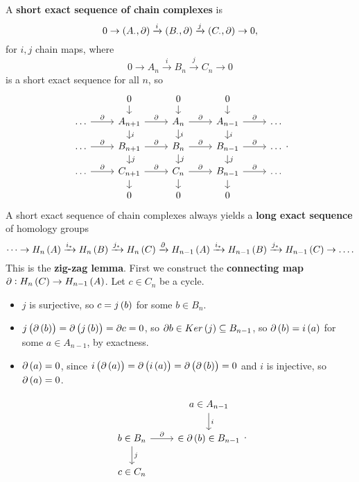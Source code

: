 A \textbf{short exact sequence of chain complexes} is
$$ 0 \to \br{A_\cdot, \partial} \xrightarrow{i} \br{B_\cdot, \partial} \xrightarrow{j} \br{C_\cdot, \partial} \to 0, $$
for $ i, j $ chain maps, where
$$ 0 \to A_n \xrightarrow{i} B_n \xrightarrow{j} C_n \to 0 $$
is a short exact sequence for all $ n $, so
$$
\begin{tikzcd}[row sep=small]
& 0 \arrow{d} & 0 \arrow{d} & 0 \arrow{d} & \\
\dots \arrow{r}{\partial} & A_{n + 1} \arrow{r}{\partial} \arrow{d}{i} & A_n \arrow{r}{\partial} \arrow{d}{i} & A_{n - 1} \arrow{r}{\partial} \arrow{d}{i} & \dots \\
\dots \arrow{r}{\partial} & B_{n + 1} \arrow{r}{\partial} \arrow{d}{j} & B_n \arrow{r}{\partial} \arrow{d}{j} & B_{n - 1} \arrow{r}{\partial} \arrow{d}{j} & \dots \\
\dots \arrow{r}{\partial} & C_{n + 1} \arrow{r}{\partial} \arrow{d} & C_n \arrow{r}{\partial} \arrow{d} & B_{n - 1} \arrow{r}{\partial} \arrow{d} & \dots \\
& 0 & 0 & 0 &
\end{tikzcd}.
$$
A short exact sequence of chain complexes always yields a \textbf{long exact sequence} of homology groups
$$ \dots \to H_n\br{A} \xrightarrow{i_*} H_n\br{B} \xrightarrow{j_*} H_n\br{C} \xrightarrow{\partial} H_{n - 1}\br{A} \xrightarrow{i_*} H_{n - 1}\br{B} \xrightarrow{j_*} H_{n - 1}\br{C} \to \dots. $$
This is the \textbf{zig-zag lemma}. First we construct the \textbf{connecting map} $ \partial : H_n\br{C} \to H_{n - 1}\br{A} $. Let $ c \in C_n $ be a cycle.
\begin{itemize}
\item $ j $ is surjective, so $ c = j\br{b} $ for some $ b \in B_n $.
\item $ j\br{\partial\br{b}} = \partial\br{j\br{b}} = \partial c = 0 $, so $ \partial b \in Ker\br{j} \subseteq B_{n - 1} $, so $ \partial\br{b} = i\br{a} $ for some $ a \in A_{n - 1} $, by exactness.
\item $ \partial\br{a} = 0 $, since $ i\br{\partial\br{a}} = \partial\br{i\br{a}} = \partial\br{\partial\br{b}} = 0 $ and $ i $ is injective, so $ \partial\br{a} = 0 $.
\end{itemize}
$$
\begin{tikzcd}
& a \in A_{n - 1} \arrow{d}{i} \\
b \in B_n \arrow{r}{\partial} \arrow{d}{j} & \in \partial\br{b} \in B_{n - 1} \\
c \in C_n &
\end{tikzcd}.
$$

